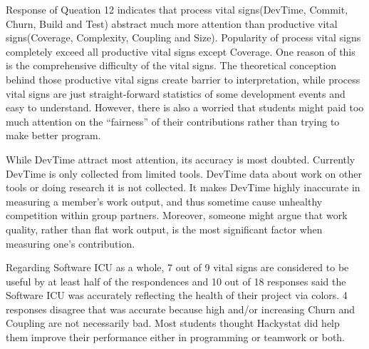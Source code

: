 \documentclass[11pt]{article}
\begin{document}
Response of Queation 12 indicates that process vital signs(DevTime, Commit, Churn, Build and Test) abstract much more attention than productive vital signs(Coverage, Complexity, Coupling and Size). Popularity of process vital signs completely exceed all productive vital signs except Coverage. One reason of this is the comprehensive difficulty of the vital signs. The theoretical conception behind those productive vital signs create barrier to interpretation, while process vital signs are just straight-forward statistics of some development events and easy to understand. However, there is also a worried that students might paid too much attention on the ``fairness'' of their contributions rather than trying to make better program.


While DevTime attract most attention, its accuracy is most doubted. Currently DevTime is only collected from limited tools. DevTime data about work on other tools or doing research it is not collected. It makes DevTime highly inaccurate in measuring a member's work output, and thus sometime cause unhealthy competition within group partners. Moreover, someone might argue that work quality, rather than flat work output, is the most significant factor when measuring one's contribution.

Regarding Software ICU as a whole, 7 out of 9 vital signs are considered to be useful by at least half of the respondences and 10 out of 18 responses said the Software ICU was accurately reflecting the health of their project via colors. 4 responses disagree that was accurate because high and/or increasing Churn and Coupling are not necessarily bad. Most students thought Hackystat did help them improve their performance either in programming or teamwork or both.
\end{document}
